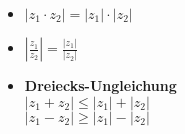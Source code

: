 \begin{multicols}{2}
    \begin{itemize}
        \item $|z_1 \cdot z_2| = |z_1| \cdot |z_2|$
        \item $|\frac{z_1}{z_2}| = \frac{|z_1|}{|z_2|}$
        \item \textbf{Dreiecks-Ungleichung}\\
        $|z_1 + z_2| \leq |z_1| + |z_2|$\\
        $|z_1 - z_2| \ge |z_1| - |z_2|$
    \end{itemize}
\end{multicols}
